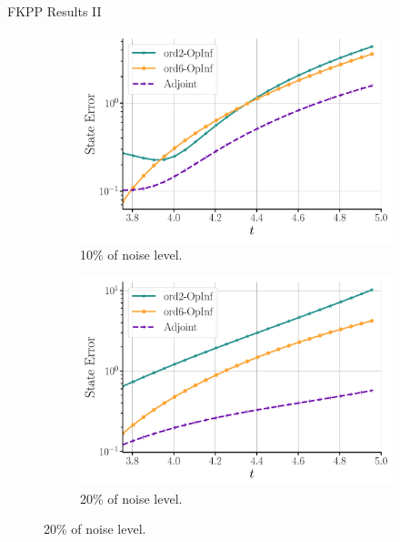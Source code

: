 \begin{frame}{FKPP Results II}
    
\begin{figure}[h!]
  \centering
  
  \begin{subfigure}[b]{0.3\textwidth}
    \centering
    \includegraphics[width=\linewidth]{images/fkpp_pred_error_vs_time_noise_10.pdf}
    \caption{10\% of noise level.}
    \label{fig:image9}
  \end{subfigure}
  \hspace{1.0cm}
  \begin{subfigure}[b]{0.3\textwidth}
    \centering
    \includegraphics[width=\linewidth]{images/fkpp_pred_error_vs_time_noise_20.pdf}
    \caption{20\% of noise level.}
    \label{fig:image10}
  \end{subfigure}
  

\end{figure}
\end{frame}
